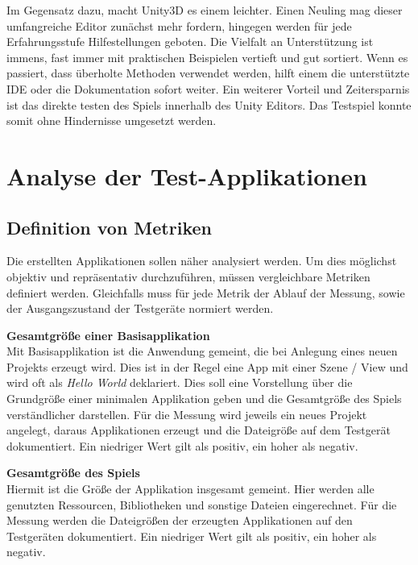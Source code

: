\bigskip
Im Gegensatz dazu, macht Unity3D es einem leichter. Einen Neuling mag dieser umfangreiche Editor zunächst mehr fordern, hingegen werden für jede Erfahrungsstufe Hilfestellungen geboten. Die Vielfalt an Unterstützung ist immens, fast immer mit praktischen Beispielen vertieft und gut sortiert. Wenn es passiert, dass überholte Methoden verwendet werden, hilft einem die unterstützte IDE oder die Dokumentation sofort weiter. Ein weiterer Vorteil und Zeitersparnis ist das direkte testen des Spiels innerhalb des Unity Editors. Das Testspiel konnte somit ohne Hindernisse umgesetzt werden.


\chapter{Analyse der Test-Applikationen}

\section{Definition von Metriken}
Die erstellten Applikationen sollen näher analysiert werden. Um dies möglichst objektiv und repräsentativ durchzuführen, müssen vergleichbare Metriken definiert werden.
Gleichfalls muss für jede Metrik der Ablauf der Messung, sowie der Ausgangszustand der Testgeräte normiert werden.

\bigskip
\textbf{Gesamtgröße einer Basisapplikation} \\
Mit Basisapplikation ist die Anwendung gemeint, die bei Anlegung eines neuen Projekts erzeugt wird. Dies ist in der Regel eine App mit einer Szene / View und wird oft als \emph{Hello World} deklariert. Dies soll eine Vorstellung über die Grundgröße einer minimalen Applikation geben und die Gesamtgröße des Spiels verständlicher darstellen. Für die Messung wird jeweils ein neues Projekt angelegt, daraus Applikationen erzeugt und die Dateigröße auf dem Testgerät dokumentiert. Ein niedriger Wert gilt als positiv, ein hoher als negativ.

\bigskip
\textbf{Gesamtgröße des Spiels} \\
Hiermit ist die Größe der Applikation insgesamt gemeint. Hier werden alle genutzten Ressourcen, Bibliotheken und sonstige Dateien eingerechnet. Für die Messung werden die Dateigrößen der erzeugten Applikationen auf den Testgeräten dokumentiert. Ein niedriger Wert gilt als positiv, ein hoher als negativ.

